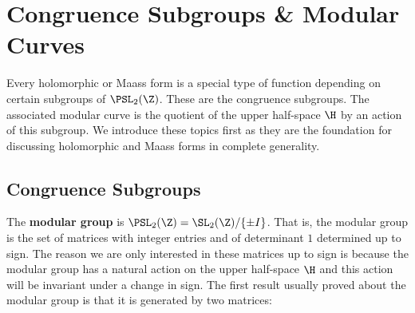   \chapter{Congruence Subgroups \& Modular Curves}
    Every holomorphic or Maass form is a special type of function depending on certain subgroups of $\PSL_{2}(\Z)$. These are the congruence subgroups. The associated modular curve is the quotient of the upper half-space $\H$ by an action of this subgroup. We introduce these topics first as they are the foundation for discussing holomorphic and Maass forms in complete generality.
    \section{Congruence Subgroups}
      The \textbf{modular group} is $\PSL_{2}(\Z) = \SL_{2}(\Z)/\{\pm I\}$. That is, the modular group is the set of matrices with integer entries and of determinant $1$ determined up to sign. The reason we are only interested in these matrices up to sign is because the modular group has a natural action on the upper half-space $\H$ and this action will be invariant under a change in sign. The first result usually proved about the modular group is that it is generated by two matrices:

